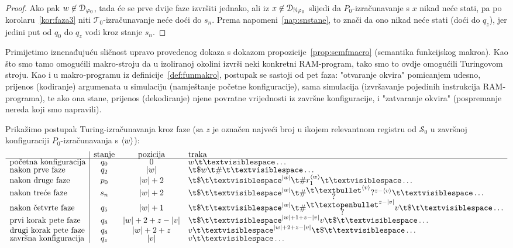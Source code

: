 \begin{proof}
Ako pak $w\not\in\mathcal D_{\varphi_0}$, tada će se prve dvije faze izvršiti jednako, ali iz $x\not\in\mathcal D_{{\mathbb N}\varphi_0}$ slijedi da $P_0$-izračunavanje s $x$ nikad neće stati, pa po korolaru~\ref{kor:faza3} niti $\mathcal T_0$-izračunavanje neće doći do $s_n$. Prema napomeni~\ref{nap:snstane}, to znači da ono nikad neće stati (doći do $q_z$), jer jedini put od $q_0$ do $q_z$ vodi kroz stanje $s_n$.
\end{proof}

Primijetimo iznenađujuću sličnost upravo provedenog dokaza s dokazom propozicije~\ref{prop:semfmacro} (semantika funkcijskog makroa). Kao što smo tamo omogućili makro-stroju da u izoliranoj okolini izvrši neki konkretni RAM-program, tako smo to ovdje omogućili Turingovom stroju. Kao i u makro-programu iz definicije~\ref{def:funmakro}, postupak se sastoji od pet faza: "otvaranje okvira" pomicanjem udesno, prijenos (kodiranje) argumenata u simulaciju (namještanje početne konfiguracije), sama simulacija (izvršavanje pojedinih instrukcija RAM-programa), te ako ona stane, prijenos (dekodiranje) njene povratne vrijednosti iz završne konfiguracije, i "zatvaranje okvira" (pospremanje nereda koji smo napravili).

Prikažimo postupak Turing-iz\-ra\-ču\-na\-va\-nja kroz faze (sa $z$ je označen najveći broj u ikojem relevantnom registru od $\mathcal S_0$ u završnoj konfiguraciji $P_0$-izračunavanja s $\langle w\rangle$):
\begin{equation}
\begin{array}{l|ccl}
                             &\text{stanje}&\text{pozicija}&\text{traka}\\\hline
\text{početna konfiguracija} & q_0 & 0         & w\bl\ldots \\
\text{nakon prve faze}       & q_2 & \dulj w   & \t\$w\t\#\bl\ldots \\
\text{nakon druge faze}      & p_0 & \dulj w+2 & \t\$\bl^{\dulj w}\t\#r_1^{\kr w}\bl\ldots \\
\text{nakon treće faze}      & s_n & \dulj w+2 & \renewcommand{\arraystretch}{0.1}
    \t\$\bl^{\dulj w}\t\#\begin{array}{@{}c@{}}\t\textbullet\\?\end{array}^{\kr{v}}?^{z-\kr{v}}\bl\ldots\\
\text{nakon četvrte faze}    & q_5 & \dulj w+1 &
\renewcommand{\arraystretch}{0.1}
\t\$\bl^{\dulj w}\t\#\begin{array}{@{}c@{}}\t\textopenbullet\\?\end{array}^{z-\dulj v}v\t\$\bl\ldots\\
\text{prvi korak pete faze} & q_8 & \dulj w+2+z-\dulj v       & \t\$\bl^{\dulj w+1+z-\dulj v}v\t\$\bl\ldots\\
\text{drugi korak pete faze}& q_8 & \dulj w+2+z & v\bl^{\dulj w+2+z-\dulj v}\t\$\bl\ldots\\
\text{završna konfiguracija} & q_z & \dulj v   & v\bl\ldots
\end{array}
\end{equation}

